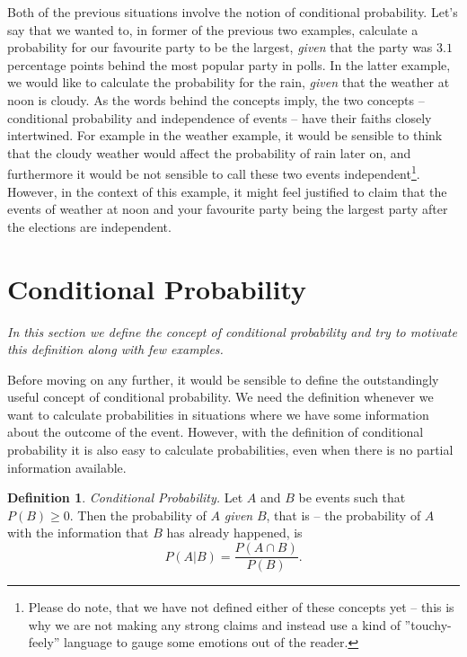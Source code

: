\documentclass[12pt,a4paper,leqno]{report}
\theoremstyle{plain}
\theoremstyle{definition}
\newtheorem{maar}[equation]{Definition}
\begin{document}
Both of the previous situations involve the notion of conditional probability. Let's say that we wanted to, in former of the previous two examples, calculate a probability for our favourite party to be the largest, \emph{given} that the party was $3.1$ percentage points behind the most popular party in polls. In the latter example, we would like to calculate the probability for the rain, \emph{given} that the weather at noon is cloudy. As the words behind the concepts imply, the two concepts -- conditional probability and independence of events -- have their faiths closely intertwined. For example in the weather example, it would be sensible to think that the cloudy weather would affect the probability of rain later on, and furthermore it would be not sensible to call these two events independent\footnote{Please do note, that we have not defined either of these concepts yet -- this is why we are not making any strong claims and instead use a kind of ''touchy-feely'' language to gauge some emotions out of the reader.}. However, in the context of this example, it might feel justified to claim that the events of weather at noon and your favourite party being the largest party after the elections are independent.

\section{Conditional Probability}

\emph{In this section we define the concept of conditional probability and try to motivate this definition along with few examples.}

Before moving on any further, it would be sensible to define the outstandingly useful concept of conditional probability. We need the definition whenever we want to calculate probabilities in situations where we have some information about the outcome of the event. However, with the definition of conditional probability it is also easy to calculate probabilities, even when there is no partial information available.

\begin{maar}\label{maar:conditional_prob}
\emph{Conditional Probability.} Let $A$ and $B$ be events such that $P(B) \geq 0$. Then the probability of $A$ \emph{given} $B$, that is -- the probability of $A$ with the information that $B$ has already happened, is 
\[
P(A|B) = \frac{P(A \cap B)}{P(B)}.
\]
\end{maar}
\end{document}
